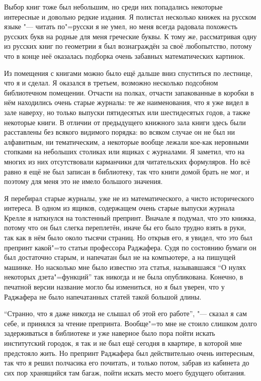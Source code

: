 Выбор книг тоже был небольшим, но среди них попадались некоторые интересные и
довольно редкие издания.
Я полистал несколько книжек на русском языке "--- читать по"=русски я не умел,
но меня всегда радовала похожесть русских букв на родные для меня греческие
буквы.
К тому же, рассматривая одну из русских книг по геометрии я был вознаграждён за
своё любопытство, потому что в конце неё оказалась подборка очень забавных
математических картинок.

Из помещения с книгами можно было ещё дальше вниз спуститься по лестнице, что я
и сделал.
Я оказался в третьем, возможно несколько подсобном библиотечном помещении.
Отчасти на полках, отчасти запакованные в коробки в нём находились очень старые
журналы:
те же наименования, что я уже видел в зале наверху, но только выпуски
пятидесятых или шестидесятых годов, а также некоторые книги.
В отличии от предыдущего книжного зала книги здесь были расставлены без всякого
видимого порядка: во всяком случае он не был ни алфавитным, ни тематическим, а
некоторые вообще лежали кое-как неровными стопками на небольших столиках или
ящиках с журналами.
Я заметил, что на многих из них отсутствовали карманчики для читательских
формуляров.
Но всё равно я ещё не был записан в библиотеку, так что книги домой брать не мог,
и поэтому для меня это не имело большого значения.

Я перебирал старые журналы, уже не из математического, а чисто исторического
интереса.
В одном из ящиков, содержащем очень старые выпуски журнала Крелле я наткнулся на
толстенный препринт.
Вначале я подумал, что это книжка, потому что он был слегка переплетён, иначе бы
его было трудно взять в руки, так как в нём было около тысячи страниц.
Но открыв его, я увидел, что это был препринт какой"=то статьи профессора
Раджафера.
Судя по состоянию бумаги он был достаточно старым, и напечатан был не на
компьютере, а на пишущей машинке.
Но насколько мне было известно эта статья, называвшаяся \enquote{О нулях
некоторых дзета"=функций} так никогда и не была опубликована.
Конечно, в печатной версии название могло бы измениться, но я был уверен, что у
Раджафера не было напечатанных статей такой большой длины.

\enquote{Странно, что я даже никогда не слышал об этой его работе}, "--- сказал
я сам себе, и принялся за чтение препринта.
Вообще"=то мне не стоило слишком долго задерживаться в библиотеке и уже наверное
было пора пойти искать институтский городок, я так и не был ещё сегодня в
квартире, в которой мне предстояло жить.
Но препринт Раджафера был действительно очень интересным, так что я решил
полчасика его почитать, и только потом, забрав из кабинета до сих пор хранящийся
там багаж, пойти искать место моего будущего обитания.

